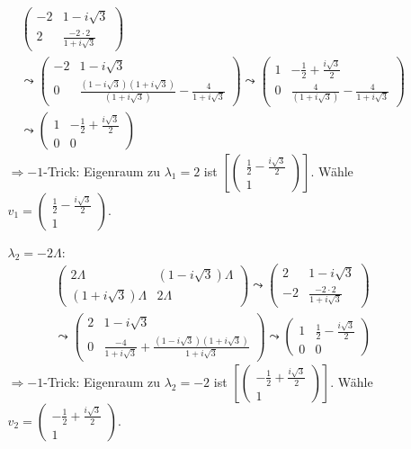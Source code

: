 \documentclass{scrartcl}
\newcommand{\vecz}[2]{\begin{pmatrix}#1 \\ #2\end{pmatrix}}
\begin{document}
\begin{enumerate}[a)]
\begin{itemize}
\begin{align*}
\begin{pmatrix}
-2 & 1-i\sqrt 3 \\
2 & \frac{-2 \cdot 2}{1+i\sqrt 3}
\end{pmatrix} \\
\leadsto\begin{pmatrix}
-2 & 1-i\sqrt 3 \\
0 & \frac{(1-i\sqrt 3)(1+i\sqrt 3)}{(1+i\sqrt 3)}-\frac{4}{1+i\sqrt 3}
\end{pmatrix}
\leadsto\begin{pmatrix}
1 & -\frac 12 + \frac{i\sqrt 3}2 \\
0 & \frac{4}{(1+i\sqrt 3)}-\frac{4}{1+i\sqrt 3}
\end{pmatrix}\\
\leadsto\begin{pmatrix}
1 & -\frac 12 + \frac{i\sqrt 3}2 \\
0 & 0
\end{pmatrix}
\end{align*}
$\Rightarrow -1$-Trick: Eigenraum zu $\lambda_1=2$ ist $\left[\vecz{\frac 12 -\frac{i\sqrt 3}2}1 \right]$. Wähle $v_1=\vecz{\frac 12 -\frac{i\sqrt 3}2}1$.

\item[$\lambda_2=-2\Lambda$:]
\begin{align*}
\begin{pmatrix}
2\Lambda & (1-i\sqrt 3)\Lambda \\ (1+i\sqrt 3)\Lambda & 2\Lambda
\end{pmatrix} \leadsto
\begin{pmatrix}
2 & 1-i\sqrt 3 \\ -2 & \frac{-2 \cdot 2}{1+i\sqrt 3}
\end{pmatrix} \\
\leadsto
\begin{pmatrix}
2 & 1-i\sqrt 3 \\ 0 & \frac{-4}{1+i\sqrt 3} +\frac{(1-i\sqrt 3) (1+i\sqrt 3)}{1+i\sqrt 3}
\end{pmatrix}
\leadsto
\begin{pmatrix}
1 & \frac 12 - \frac{i\sqrt 3}2 \\ 0 & 0
\end{pmatrix}
\end{align*}
$\Rightarrow -1$-Trick: Eigenraum zu $\lambda_2=-2$ ist $\left[\vecz{-\frac 12 +\frac{i\sqrt 3}2}1 \right]$. Wähle $v_2=\vecz{-\frac 12 +\frac{i\sqrt 3}2}1$.
\end{itemize}


\end{enumerate}
\end{document}
